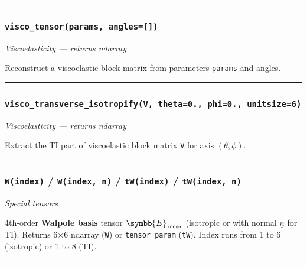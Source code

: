 \documentclass[
  a4paper,
  numbers=noendperiod,
  DIV=12]{scrreprt}
\newcommand{\uuuu}[1]{{\symbb{{#1}}}}
\newcommand{\uv}[1]{{\underline{{#1}}}}
\begin{document}
\begin{center}\rule{0.5\linewidth}{0.5pt}\end{center}

\subsubsection{\texorpdfstring{\texttt{visco\_tensor(params,\ angles={[}{]})}}{visco\_tensor(params, angles={[}{]})}}\label{api-visco-tensor}

\emph{Viscoelasticity --- returns ndarray}

Reconstruct a viscoelastic block matrix from parameters \texttt{params}
and angles.

\begin{center}\rule{0.5\linewidth}{0.5pt}\end{center}

\subsubsection{\texorpdfstring{\texttt{visco\_transverse\_isotropify(V,\ theta=0.,\ phi=0.,\ unitsize=6)}}{visco\_transverse\_isotropify(V, theta=0., phi=0., unitsize=6)}}\label{api-visco-transverse-isotropify}

\emph{Viscoelasticity --- returns ndarray}

Extract the TI part of viscoelastic block matrix \texttt{V} for axis
\((\theta,\phi)\).

\begin{center}\rule{0.5\linewidth}{0.5pt}\end{center}

\subsubsection{\texorpdfstring{\texttt{W(index)} / \texttt{W(index,\ n)}
/ \texttt{tW(index)} /
\texttt{tW(index,\ n)}}{W(index) / W(index, n) / tW(index) / tW(index, n)}}\label{api-W}

\emph{Special tensors}

4th-order \textbf{Walpole basis} tensor \(\uuuu{E}_{\tt index}\)
(isotropic or with normal \(\uv{n}\) for TI). Returns 6×6 ndarray
(\texttt{W}) or \texttt{tensor\_param} (\texttt{tW}). Index runs from 1
to 6 (isotropic) or 1 to 8 (TI).

\begin{center}\rule{0.5\linewidth}{0.5pt}\end{center}
\end{document}
